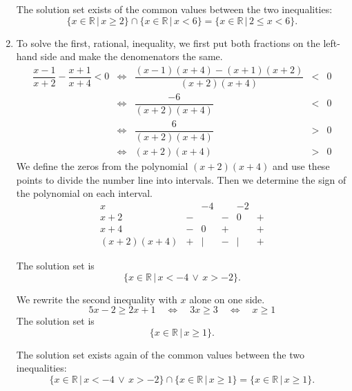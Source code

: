 \begin{example}
\begin{enumerate}
The solution set exists of the common values between the two inequalities:
\[ \{x\in\mathbb{R} \, | \, x\geq 2\} \cap \{x\in \mathbb{R} \, | \,  x<6\}=\{x\in \mathbb{R}\,  | \,  2\leq x<6\}.\]

\item To solve the first, rational, inequality, we first put both fractions on the left-hand side and make the denomenators the same. 
\[\begin{array}{rcrcl}
	\dfrac{x-1}{x+2}-\dfrac{x+1}{x+4} < 0	& \Leftrightarrow& \dfrac{(x-1)(x+4)-(x+1)(x+2)}{(x+2)(x+4)} & < &0 \\[0.4cm]
	& \Leftrightarrow& \dfrac{-6}{(x+2)(x+4)} & < &0  \\[0.4cm]
	& \Leftrightarrow& \dfrac{6}{(x+2)(x+4)} & > & 0 \\[0.4cm]
	& \Leftrightarrow& (x+2)(x+4) & > & 0
\end{array}
\]
We define the zeros from the polynomial $(x+2)(x+4)$ and use these points to divide the number line into intervals. Then we determine the sign of the polynomial on each interval.
\[ \begin{array}{c|ccccc}
x     &      &-4     &	    &-2      & \\
\hline
x+2   &-     &	     &-     &0	     &+ \\
x+4   &-     &0      &+     &	     &+ \\
\hline
(x+2)(x+4) &+  &|    &-     &|	     &+
\end{array}\] 

The solution set is
\[\{x \in \mathbb{R}\, | \, x<-4  \, \vee \, x>-2\}. \]


We rewrite the second inequality with $x$ alone on one side.
\[ 5x-2 \geq 2x+1 \quad \Leftrightarrow \quad 3x \geq 3  \quad \Leftrightarrow \quad x\geq 1 \]
The solution set is
\[\{x\in \mathbb{R}\, |\, x \geq 1\}. \]


The solution set exists again of the common values between the two inequalities:
\[ \{ x\in \mathbb{R}\, |\, x<-4 \, \vee \, x>-2\} \cap \{x \in \mathbb{R}\, | \, x\geq 1\} =\{x\in \mathbb{R} \, | \, x\geq 1\}. \]


\end{enumerate}	

\end{example}



